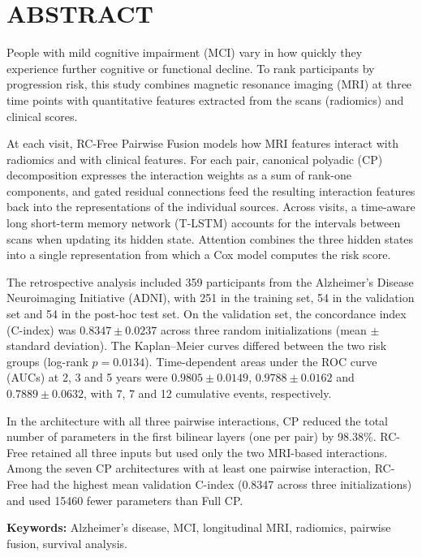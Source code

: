 \chapter*{ABSTRACT}

People with mild cognitive impairment (MCI) vary in how quickly they experience further cognitive or functional decline. To rank participants by progression risk, this study combines magnetic resonance imaging (MRI) at three time points with quantitative features extracted from the scans (radiomics) and clinical scores.

At each visit, RC-Free Pairwise Fusion models how MRI features interact with radiomics and with clinical features. For each pair, canonical polyadic (CP) decomposition expresses the interaction weights as a sum of rank-one components, and gated residual connections feed the resulting interaction features back into the representations of the individual sources. Across visits, a time-aware long short-term memory network (T-LSTM) accounts for the intervals between scans when updating its hidden state. Attention combines the three hidden states into a single representation from which a Cox model computes the risk score.

The retrospective analysis included 359 participants from the Alzheimer's Disease Neuroimaging Initiative (ADNI), with 251 in the training set, 54 in the validation set and 54 in the post-hoc test set. On the validation set, the concordance index (C-index) was $0.8347\pm0.0237$ across three random initializations (mean $\pm$ standard deviation). The Kaplan--Meier curves differed between the two risk groups (log-rank $p=0.0134$). Time-dependent areas under the ROC curve (AUCs) at 2, 3 and 5 years were $0.9805\pm0.0149$, $0.9788\pm0.0162$ and $0.7889\pm0.0632$, with 7, 7 and 12 cumulative events, respectively.

In the architecture with all three pairwise interactions, CP reduced the total number of parameters in the first bilinear layers (one per pair) by 98.38\%. RC-Free retained all three inputs but used only the two MRI-based interactions. Among the seven CP architectures with at least one pairwise interaction, RC-Free had the highest mean validation C-index (0.8347 across three initializations) and used 15460 fewer parameters than Full CP.

\noindent\textbf{Keywords:} Alzheimer's disease, MCI, longitudinal MRI, radiomics, pairwise fusion, survival analysis.
